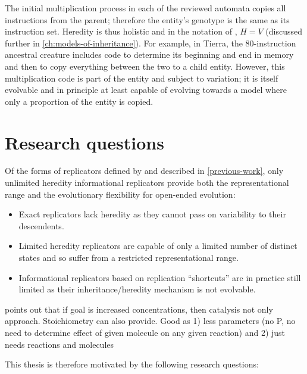 The initial multiplication process in each of the reviewed automata copies all instructions from the parent; therefore the entity's genotype is the same as its instruction set. Heredity is thus holistic and in the notation of \citeauthor{Zachar2010}, $H=V$ (discussed further in \cref{ch:models-of-inheritance}). For example, in Tierra, the 80-instruction ancestral creature includes code to determine its beginning and end in memory and then to copy everything between the two to a child entity. However, this multiplication code is part of the entity and subject to variation; it is itself evolvable and in principle at least capable of evolving towards a model where only a proportion of the entity is copied.

\section{Research questions}\label{research-questions}

Of the forms of replicators defined by \textcite{Zachar2010} and described in \cref{previous-work}, only unlimited heredity informational replicators provide both the representational range and the evolutionary flexibility for open-ended evolution:

\begin{itemize}[noitemsep]
	\item Exact replicators lack heredity as they cannot pass on variability to their descendents.
	\item Limited heredity replicators are capable of only a limited number of distinct states and so suffer from a restricted representational range.
	\item Informational replicators based on replication ``shortcuts'' are in practice still limited as their inheritance/heredity mechanism is not evolvable.
\end{itemize} 
 
\Cite{Virgo2013} points out that if goal is increased concentrations, then catalysis not only approach. Stoichiometry can also provide.
Good as 1) less parameters (no P, no need to determine effect of given molecule on any given reaction) and 2) just needs reactions and molecules

This thesis is therefore motivated by the following research questions:

